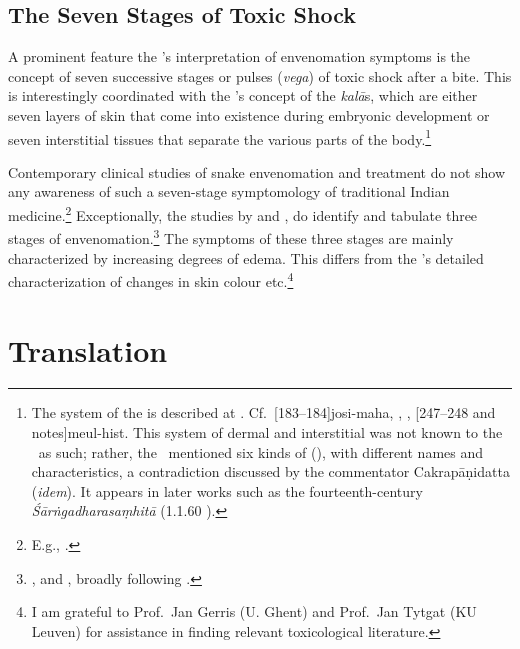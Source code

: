 \subsection{The Seven Stages of Toxic Shock}

A prominent feature the \SS's interpretation of envenomation symptoms is
the concept of seven successive stages or pulses (\emph{vega}) of toxic
shock after a bite. This is interestingly coordinated with the \SS's
concept of the \emph{kalā}s, which are either seven
layers of skin that come into existence during embryonic
development or seven interstitial tissues that separate the various parts
of the body.\footnote{\label{ka4:kalā}The system of the  is
    described at .  Cf.\
    [183--184]{josi-maha}, \cite[227--228]{gupt-1983},
    \cite[6]{kutu-1962}, \volcite{1}[247--248 and notes]{meul-hist}.  This system 
    of dermal and interstitial \dev{kalā}
    was not known to the \CS\ as such; rather, the \CS\ mentioned six kinds
    of \sed{tvac}{skin} (\Ca{4.7.4}{337}), with different names and
    characteristics, a contradiction discussed by the commentator
    Cakrapāṇidatta (\textit{idem}). It appears in later 
    works such as the
    fourteenth-century \emph{Śārṅgadharasaṃhitā} (1.1.60
    \citep[15]{sast-1931}).}
    
Contemporary clinical studies of snake envenomation and treatment do not
show any awareness of such a seven-stage symptomology of traditional Indian 
medicine.\footnote{E.g.,
    \cites
    {elle-1997}
    {wein-2009}
    [1747--1749]{pill-2013}
    [19]{who-2019}
    {meht-2002}
    {hamz-2021}
    {desh-2022}.}
    Exceptionally, the studies by \citeauthor{barc-2008} and
    \citeauthor{oezb-2021}, do identify and tabulate three stages of
    envenomation.\footnote{\cite[1017, Table 176.3]{barc-2008}, and \cite[7,
        and Table 1]{oezb-2021}, broadly following \citeauthor{barc-2008}.}  The
        symptoms of these three stages are mainly characterized by increasing
        degrees of edema.  This differs from the \SS's detailed characterization
        of changes in skin colour etc.\footnote{I am grateful to Prof.\ Jan Gerris
            (U. Ghent) and Prof.\ Jan Tytgat (KU Leuven) for assistance in finding
            relevant toxicological literature.}


\section{Translation}

